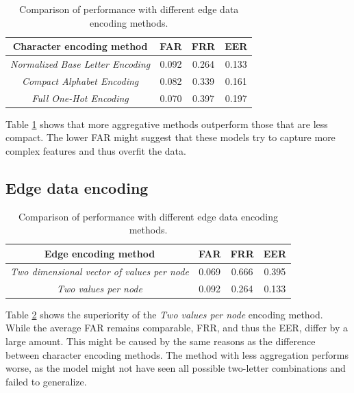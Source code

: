 \begin{center}
	\begin{table}[H]
		\begin{center}
			\begin{tabular}{ |c|c|c|c| } 
				\hline
				Character encoding method & FAR & FRR & EER \\
				\hline
				\textit{Normalized Base Letter Encoding} & 0.092 & 0.264 & 0.133 \\
				\hline
				\textit{Compact Alphabet Encoding} & 0.082 & 0.339 & 0.161 \\
				\hline
				\textit{Full One-Hot Encoding} & 0.070 & 0.397 & 0.197 \\
				\hline
			\end{tabular}
		\end{center}
		\caption{Comparison of performance with different edge data encoding methods.}
		\label{table:char_encoding}
	\end{table}
\end{center}

Table \ref{table:char_encoding} shows that more aggregative methods outperform those that are less compact. The lower FAR might suggest that these models try to capture more complex features and thus overfit the data.

\subsection{Edge data encoding}

\begin{center}
	\begin{table}[H]
		\begin{center}
			\begin{tabular}{ |c|c|c|c| } 
				\hline
				Edge encoding method & FAR & FRR & EER \\
				\hline
				\textit{Two dimensional vector of values per node} & 0.069 & 0.666 & 0.395 \\
				\hline
				\textit{Two values per node} & 0.092 & 0.264 & 0.133 \\
				\hline
			\end{tabular}
		\end{center}
		\caption{Comparison of performance with different edge data encoding methods.}
		\label{table:egde_encoding_comp}
	\end{table}
\end{center}

Table \ref{table:egde_encoding_comp} shows the superiority of the \textit{Two values per node} encoding method. While the average FAR remains comparable, FRR, and thus the EER, differ by a large amount. This might be caused by the same reasons as the difference between character encoding methods. The method with less aggregation performs worse, as the model might not have seen all possible two-letter combinations and failed to generalize.


